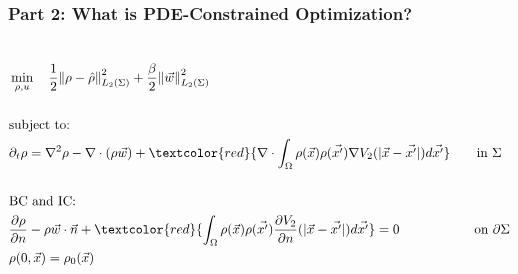 \documentclass[aspectratio=169,xcolor=dvipsnames]{beamer}
\begin{document}
\begin{frame}
	\frametitle{Part 2: What is PDE-Constrained Optimization? }
	\begin{columns}


		\begin{align*}
		&\min_{\rho,u} \quad \frac{1}{2}\norm{\rho- \hat{\rho}}_{L_2(\Sigma)}^2 + \frac{\beta}{2} \norm{\vec{w}}_{L_2(\Sigma)}^2\\
		\\
		&\text{subject to:}
		\\
		& \partial_t \rho = \nabla^2 \rho - \nabla \cdot (\rho \vec{w})+\textcolor{red}{\nabla \cdot \int_\Omega \rho(\vec{x}) \rho(\vec{x'}) \nabla V_2(|\vec{x}-\vec{x'}|)d\vec{x'}} \qquad \text{in    } \Sigma\\
		\\
		&\text{BC } \text{and IC:}\\
		&\frac{\partial \rho}{\partial n} - \rho \vec{w} \cdot \vec{n} +\textcolor{red}{ \int_\Omega \rho(\vec{x}) \rho(\vec{x'})  \frac{ \partial  V_2}{\partial n}(|\vec{x}-\vec{x'}|)d\vec{x'}} = 0 \quad \ \ \qquad \qquad\text{on   } \partial \Sigma   \\
		&\rho(0,\vec{x}) = \rho_0(\vec{x}) 
		\end{align*}
		\vspace{-1cm}
		\begin{figure}	
			\includegraphics[width=3cm]{bloodcells.jpg}\\
			\includegraphics[width=3cm]{bacteria.png}\\			
			\includegraphics[width=3cm]{Microfilter.png}\\
			\includegraphics[width=3cm]{beer.png}
		\end{figure}
	\end{columns}
\end{frame}
\end{document}
